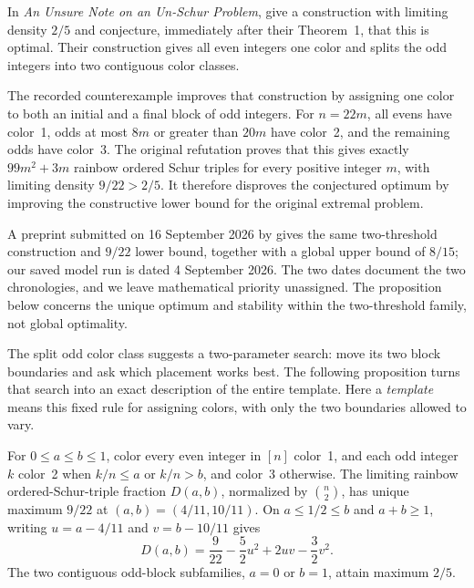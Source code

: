 In \emph{An Unsure Note on an Un-Schur Problem},
\citet{parczyk2026unschur} give a construction with limiting density
$2/5$ and conjecture, immediately after their Theorem~1, that this is
optimal. Their construction gives all even integers one color and
splits the odd integers into two contiguous color classes.

The recorded counterexample improves that construction by assigning
one color to both an initial and a final block of odd integers. For
$n=22m$, all evens have color~1, odds at most $8m$ or greater than
$20m$ have color~2,
and the remaining odds have color~3. The original refutation proves
that this gives exactly $99m^2+3m$ rainbow ordered Schur triples for
every positive integer $m$, with limiting density $9/22>2/5$. It therefore
disproves the conjectured optimum by improving the constructive lower
bound for the original extremal problem.

A preprint submitted on 16 September 2026 by \citet{hegde2026somewhat} gives the same two-threshold construction and $9/22$ lower bound, together with a global upper bound of $8/15$; our saved model run is dated 4 September 2026. The two dates document the two chronologies, and we leave mathematical priority unassigned. The proposition below concerns the unique optimum and stability within the two-threshold family, not global optimality.

The split odd color class suggests a two-parameter search: move its two
block boundaries and ask which placement works best. The following
proposition turns that search into an exact description of the entire
template. Here a \emph{template} means this fixed rule for assigning
colors, with only the two boundaries allowed to vary.

\begin{structuralproposition}
\label{prop:schur-template-optimum}
For $0\le a\le b\le1$, color every even integer in $[n]$ color~1,
and each odd integer $k$ color~2 when $k/n\le a$ or $k/n>b$, and
color~3 otherwise. The limiting rainbow ordered-Schur-triple fraction
$D(a,b)$, normalized by $\binom n2$, has unique maximum $9/22$ at
$(a,b)=(4/11,10/11)$. On $a\le1/2\le b$ and $a+b\ge1$, writing
$u=a-4/11$ and $v=b-10/11$ gives
\begin{equation}
 D(a,b)=\frac9{22}-\frac52u^2+2uv-\frac32v^2.
 \label{eq:schur-template-stability}
\end{equation}
The two contiguous odd-block subfamilies, $a=0$ or $b=1$, attain
maximum $2/5$.
\end{structuralproposition}

